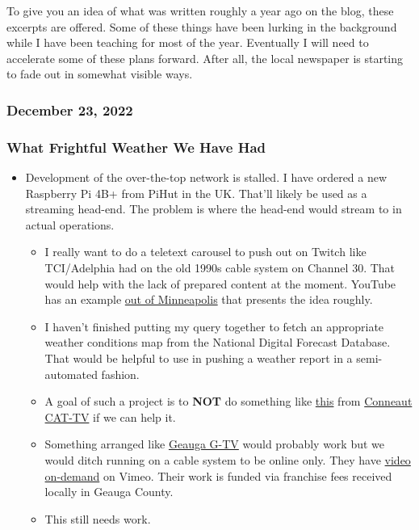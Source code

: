 To give you an idea of what was written roughly a year ago on the blog,
these excerpts are offered. Some of these things have been lurking in
the background while I have been teaching for most of the year.
Eventually I will need to accelerate some of these plans forward. After
all, the local newspaper is starting to fade out in somewhat visible
ways.

\subsubsection{December 23, 2022}\label{december-23-2022}

\subsubsection{What Frightful Weather We Have
Had}\label{what-frightful-weather-we-have-had}

\begin{itemize}
\tightlist
\item
  Development of the over-the-top network is stalled. I have ordered a
  new Raspberry Pi 4B+ from PiHut in the UK. That'll likely be used as a
  streaming head-end. The problem is where the head-end would stream to
  in actual operations.

  \begin{itemize}
  \tightlist
  \item
    I really want to do a teletext carousel to push out on Twitch like
    TCI/Adelphia had on the old 1990s cable system on Channel 30. That
    would help with the lack of prepared content at the moment. YouTube
    has an example \href{https://youtu.be/bhw25jFm5So}{out of
    Minneapolis} that presents the idea roughly.
  \item
    I haven't finished putting my query together to fetch an appropriate
    weather conditions map from the National Digital Forecast Database.
    That would be helpful to use in pushing a weather report in a
    semi-automated fashion.
  \item
    A goal of such a project is to \textbf{NOT} do something like
    \href{https://vimeo.com/783282497}{this} from
    \href{https://vimeo.com/user126359532}{Conneaut CAT-TV} if we can
    help it.
  \item
    Something arranged like \href{https://geaugatv.org/contact}{Geauga
    G-TV} would probably work but we would ditch running on a cable
    system to be online only. They have
    \href{https://vimeo.com/gtvvideos}{video on-demand} on Vimeo. Their
    work is funded via franchise fees received locally in Geauga County.
  \item
    This still needs work.
  \end{itemize}
\end{itemize}

